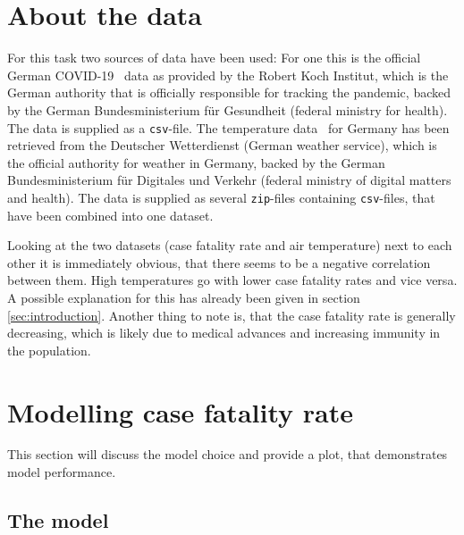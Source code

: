 \documentclass{article}
\begin{document}
\section{About the data}

For this task two sources of data have been used: For one this is the official German COVID-19~\cite{rki_2022} data as provided by the Robert Koch Institut, which is the German authority that is officially responsible for tracking the pandemic, backed by the German Bundesministerium für Gesundheit (federal ministry for health). The data is supplied as a \texttt{csv}-file. The temperature data~\cite{dwd_2022} for Germany has been retrieved from the Deutscher Wetterdienst (German weather service), which is the official authority for weather in Germany, backed by the German Bundesministerium für Digitales und Verkehr (federal ministry of digital matters and health). The data is supplied as several \texttt{zip}-files containing \texttt{csv}-files, that have been combined into one dataset.

Looking at the two datasets (case fatality rate and air temperature) next to each other it is immediately obvious, that there seems to be a negative correlation between them. High temperatures go with lower case fatality rates and vice versa. A possible explanation for this has already been given in section \ref{sec:introduction}. Another thing to note is, that the case fatality rate is generally decreasing, which is likely due to medical advances and increasing immunity in the population.

\section{Modelling case fatality rate}
\label{sec:modelling}

This section will discuss the model choice and provide a plot, that demonstrates model performance.

\subsection{The model}
\end{document}
